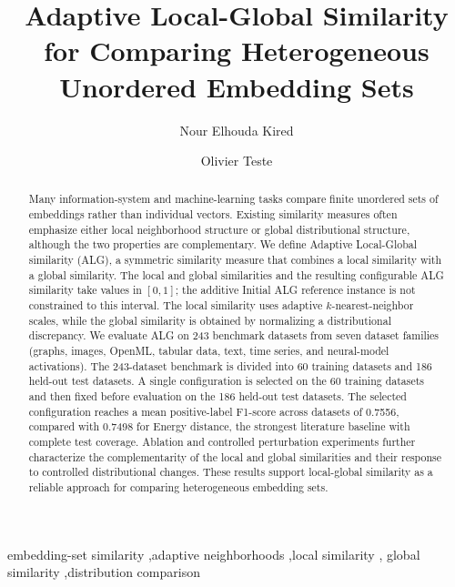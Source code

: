 \documentclass[preprint,12pt]{elsarticle}
\begin{document}
\begin{frontmatter}

\title{Adaptive Local-Global Similarity for Comparing Heterogeneous Unordered Embedding Sets}

\author[talan,irit]{Nour Elhouda Kired}
\author[irit]{Olivier Teste}
\address[talan]{Talan, Paris, France}
\address[irit]{IRIT, Universit\'e Toulouse-Jean Jaur\`es, Toulouse, France}

\begin{abstract}
Many information-system and machine-learning tasks compare finite unordered
sets of embeddings rather than individual vectors. Existing similarity measures
often emphasize either local neighborhood structure or global distributional
structure, although the two properties are complementary. We define Adaptive
Local-Global similarity (ALG), a symmetric similarity measure that combines a
local similarity with a global similarity. The local and global similarities and the resulting configurable ALG
similarity take values in $[0,1]$; the additive Initial ALG reference
instance is not constrained to this interval. The
local similarity uses adaptive $k$-nearest-neighbor scales, while the global
similarity is obtained by normalizing a distributional discrepancy. We evaluate ALG on 243 benchmark datasets from seven dataset families
(graphs, images, OpenML, tabular data, text, time series, and neural-model
activations).
The 243-dataset benchmark is divided into 60 training datasets and 186
held-out test datasets. A single configuration is selected on the 60
training datasets and then fixed before evaluation on the 186 held-out
test datasets. The selected configuration
reaches a mean positive-label F1-score across datasets of 0.7556, compared
with 0.7498 for Energy
distance, the strongest literature baseline with complete test coverage.
Ablation and controlled perturbation experiments further characterize the
complementarity of the local and global similarities and their response to
controlled distributional changes. These results support local-global
similarity as a reliable approach for comparing heterogeneous embedding sets.
\end{abstract}

\begin{keyword}
embedding-set similarity \sep adaptive neighborhoods \sep local similarity \sep
global similarity \sep distribution comparison
\end{keyword}

\end{frontmatter}
\end{document}
